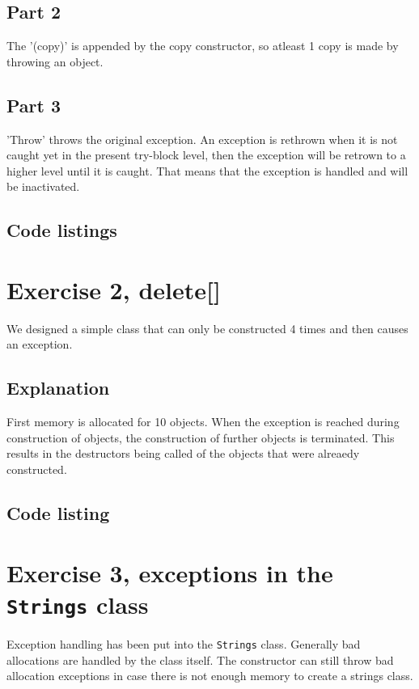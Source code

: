 \documentclass[11pt]{article}
\begin{document}
\subsection*{Part 2}
The '(copy)' is appended by the copy constructor, so atleast 1 copy is made
by throwing an object.

\subsection*{Part 3}
'Throw' throws the original exception. An exception is rethrown when it is not caught yet in the present try-block level, then the exception will be retrown to a higher level until it is caught.
That means that the exception is handled and will be inactivated.

\subsection*{Code listings}



\section*{Exercise 2, delete[]}
We designed a simple class that can only be constructed 4 times and then causes an exception.

\subsection*{Explanation}
First memory is allocated for 10 objects.
When the exception is reached during construction of objects, the construction of further objects is terminated.
This results in the destructors being called of the objects that were alreaedy constructed.

\subsection*{Code listing}





\section*{Exercise 3, exceptions in the \texttt{Strings} class}
Exception handling has been put into the \texttt{Strings} class.
Generally bad allocations are handled by the class itself.
The constructor can still throw bad allocation exceptions in case there is not enough memory to create a strings class.
\end{document}
